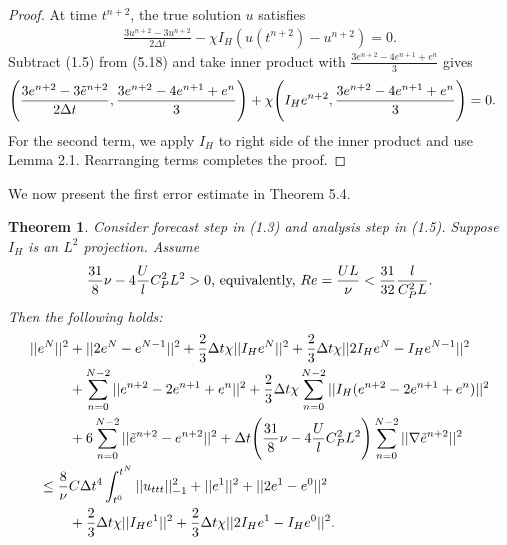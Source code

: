 \documentclass[11pt,a4paper]{article}
\newtheorem{theorem}{Theorem}[section]
\begin{document}
\begin{proof}
    At time $t^{n+2}$, the true solution $u$ satisfies
    \begin{align}
        \frac{3u^{n+2}-3u^{n+2}}{2\Delta t} -\chi I_H(u(t^{n+2})-u^{n+2})=0.
    \end{align}
    Subtract (1.5) from (5.18) and take inner product with $\frac{3e^{n+2}-4e^{n+1}+e^n}{3}$ gives
    \begin{align}
        \Bigg(\frac{3e^{n+2}-3\Tilde{e}^{n+2}}{2\Delta t}, \frac{3e^{n+2}-4e^{n+1}+e^n}{3}\Bigg)
        &+\chi \Bigg(I_He^{n+2}, \frac{3e^{n+2}-4e^{n+1}+e^n}{3}\Bigg)=0. \notag
    \end{align}
    For the second term, we apply $I_H$ to right side of the inner product and use Lemma 2.1. Rearranging terms completes the proof.
\end{proof}

We now present the first error estimate in Theorem 5.4.

\begin{theorem}
    Consider forecast step in (1.3) and analysis step in (1.5). Suppose $I_H$ is an $L^2$ projection. Assume 
    \begin{align}
        \frac{31}{8}\nu-4\frac{U}{l}C_P^2L^2>0 \text{, equivalently, } Re=\frac{UL}{\nu}<\frac{31}{32}\frac{l}{C_P^2L}. \notag
    \end{align} Then the following holds:
    \begin{align}
        ||e^N||^2
        &+||2e^N-e^{N-1}||^2+\frac{2}{3}\Delta t\chi ||I_He^N||^2+\frac{2}{3}\Delta t\chi ||2I_He^N-I_He^{N-1}||^2 \notag \\
        &+\sum_{n=0}^{N-2}||e^{n+2}-2e^{n+1}+e^n||^2 + \frac{2}{3}\Delta t\chi \sum_{n=0}^{N-2} ||I_H(e^{n+2}-2e^{n+1}+e^n)||^2 \notag \\
        &+ 6 \sum_{n=0}^{N-2} ||\tilde{e}^{n+2}-e^{n+2}||^2 +\Delta t\Bigg(\frac{31}{8}\nu -4\frac{U}{l}C_P^2L^2\Bigg) \sum_{n=0}^{N-2}||\nabla \tilde{e}^{n+2}||^2 \\
        \leq \frac{8}{\nu}&C\Delta t^4\int_{t^0}^{t^{N}}||u_{ttt}||_{-1}^2 + ||e^1||^2+||2e^1-e^0||^2 \notag \\
        &+\frac{2}{3}\Delta t\chi ||I_He^1||^2+\frac{2}{3}\Delta t\chi ||2I_He^1-I_He^0||^2. \notag
    \end{align}
\end{theorem}
\end{document}
